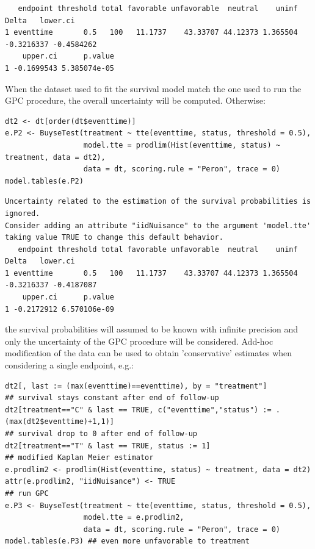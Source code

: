 \documentclass[12pt]{article}
\begin{document}
\begin{verbatim}
   endpoint threshold total favorable unfavorable  neutral    uninf      Delta   lower.ci
1 eventtime       0.5   100   11.1737    43.33707 44.12373 1.365504 -0.3216337 -0.4584262
    upper.ci      p.value
1 -0.1699543 5.385074e-05
\end{verbatim}


When the dataset used to fit the survival model match the one used to
run the GPC procedure, the overall uncertainty will be
computed. Otherwise:
\lstset{language=r,label= ,caption= ,captionpos=b,numbers=none}
\begin{lstlisting}
dt2 <- dt[order(dt$eventtime)]
e.P2 <- BuyseTest(treatment ~ tte(eventtime, status, threshold = 0.5),
                  model.tte = prodlim(Hist(eventtime, status) ~ treatment, data = dt2),
                  data = dt, scoring.rule = "Peron", trace = 0)
model.tables(e.P2)
\end{lstlisting}

\begin{verbatim}
Uncertainty related to the estimation of the survival probabilities is ignored. 
Consider adding an attribute "iidNuisance" to the argument 'model.tte' taking value TRUE to change this default behavior.
   endpoint threshold total favorable unfavorable  neutral    uninf      Delta   lower.ci
1 eventtime       0.5   100   11.1737    43.33707 44.12373 1.365504 -0.3216337 -0.4187087
    upper.ci      p.value
1 -0.2172912 6.570106e-09
\end{verbatim}


the survival probabilities will assumed to be known with infinite
precision and only the uncertainty of the GPC procedure will be
considered. Add-hoc modification of the data can be used to obtain
'conservative' estimates when considering a single endpoint, e.g.:
\lstset{language=r,label= ,caption= ,captionpos=b,numbers=none}
\begin{lstlisting}
dt2[, last := (max(eventtime)==eventtime), by = "treatment"]
## survival stays constant after end of follow-up
dt2[treatment=="C" & last == TRUE, c("eventtime","status") := .(max(dt2$eventtime)+1,1)]
## survival drop to 0 after end of follow-up
dt2[treatment=="T" & last == TRUE, status := 1]
## modified Kaplan Meier estimator
e.prodlim2 <- prodlim(Hist(eventtime, status) ~ treatment, data = dt2)
attr(e.prodlim2, "iidNuisance") <- TRUE
## run GPC
e.P3 <- BuyseTest(treatment ~ tte(eventtime, status, threshold = 0.5),
                  model.tte = e.prodlim2,
                  data = dt, scoring.rule = "Peron", trace = 0)
model.tables(e.P3) ## even more unfavorable to treatment
\end{lstlisting}
\end{document}
